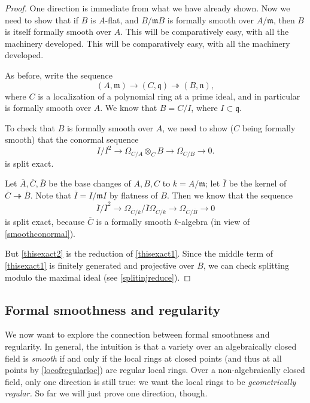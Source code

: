 \begin{proof} 
One direction is immediate from what we have already shown. Now we need to
show that if $B$ is $A$-flat, and $B/\mathfrak{m}B$ is formally smooth over
$A/\mathfrak{m}$, then $B$ is itself formally smooth over $A$.
This will be comparatively easy, with all the machinery developed.
This will be comparatively easy, with all the machinery developed.

As before, write the sequence
\[ (A, \mathfrak{m}) \to (C, \mathfrak{q}) \twoheadrightarrow
(B,\mathfrak{n}),
\]
where $C$ is a localization of a polynomial ring at a prime ideal, and in
particular is formally smooth over $A$. 
We know that $B = C/I$, where $I \subset \mathfrak{q}$.

To check that $B$ is formally smooth over $A$, we need to show ($C$ being
formally smooth) that the conormal sequence
\begin{equation} \label{thisexact1} I/I^2 \to  \Omega_{C/A} \otimes_C B \to
\Omega_{C/B} \to 0. \end{equation}
is split exact. 

Let $\overline{A}, \overline{C}, \overline{B}$ be the base changes of $A, B,
C$ to $k = A/\mathfrak{m}$; let $\overline{I}$ be the kernel of $\overline{C}
\twoheadrightarrow \overline{B}$.
Note that $\overline{I} = I/\mathfrak{m}I$ by flatness of $B$.
Then we know that the sequence
\begin{equation} \label{thisexact2} \overline{I}/\overline{I}^2 \to  \Omega_{\overline{C}/k} / \overline{I}
\Omega_{\overline{C}/k} \to \Omega_{\overline{C}/\overline{B}} \to
0\end{equation}
is split exact, because $\overline{C}$ is a formally smooth $k$-algebra (in
view of \cref{smoothconormal}).

But \eqref{thisexact2} is the reduction of \eqref{thisexact1}. Since the middle
term of \eqref{thisexact1} is finitely generated and projective over $B$, we can check
splitting modulo the maximal ideal (see \cref{splitinjreduce}).
\end{proof} 

\subsection{Formal smoothness and regularity}

We now want to explore the connection between formal smoothness and regularity.
In general, the intuition is that a variety over an algebraically closed field
is \emph{smooth} if and only if the local rings at closed points (and thus at
all points by \cref{locofregularloc}) are regular local rings. 
Over a non-algebraically closed field, only one direction is still true: we
want the local rings to be \emph{geometrically regular.}
So far we will just prove one direction, though.

